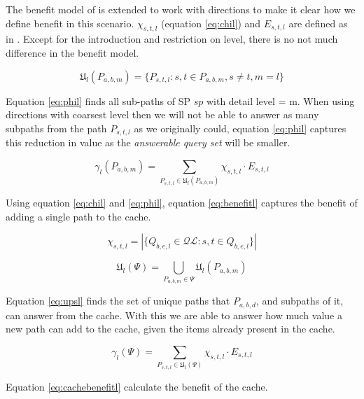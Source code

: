 The benefit model of \cite{thomsen2012} is extended to work with directions to make it clear how we define benefit in this
scenario. $\chi_{s,t,l}$ (equation \ref{eq:chil}) and $E_{s,t,l}$ are defined as in \cite{thomsen2012}. Except for the introduction and restriction on level, there is no not much difference in the benefit model.


\begin{equation} \label{eq:phil}
\mathfrak{U}_l(P_{a,b,m}) = \{ P_{s,t,l} : s, t \in P_{a,b,m},  s \neq t,  m = l\}
\end{equation}

Equation \ref{eq:phil} finds all sub-paths of SP $sp$ with detail level = m. When using directions with coarsest level then we will not be able to answer as many subpaths from the path $P_{s,t,l}$ as we originally could, equation \ref{eq:phil} captures this reduction in value as the \textit{answerable query set} will be smaller.


\begin{equation} \label{eq:benefitl}
\gamma_l(P_{a,b,m}) = \sum\limits_{P_{s,t,l} \in \mathfrak{U}_l(P_{a,b,m})} \chi_{s,t,l} \cdot E_{s,t,l}
\end{equation}

Using equation \ref{eq:chil} and \ref{eq:phil}, equation \ref{eq:benefitl} captures the benefit of adding a single path to the cache.

\begin{equation} \label{eq:chil}
\chi_{s,t,l} =  |\{ Q_{b,e,l} \in \mathcal{QL}: s, t \in Q_{b,e,l} \}|
\end{equation}


\begin{equation} \label{eq:upsl}
 \mathfrak{U}_l(\Psi) = \bigcup\limits_{P_{a,b,m} \in \Psi} \mathfrak{U}_l(P_{a,b,m})
\end{equation}

Equation \ref{eq:upsl} finds the set of unique paths that $P_{a,b,d}$, and subpaths of it, can answer from the cache. With this we are able to answer how much value a new path can add to the cache, given the items already present in the cache.

\begin{equation} \label{eq:cachebenefitl}
\gamma_l(\Psi) = \sum\limits_{P_{s,t,l} \in \mathfrak{U}_l(\Psi)} \chi_{s,t,l} \cdot E_{s,t,l}
\end{equation}

Equation \ref{eq:cachebenefitl} calculate the benefit of the cache.


